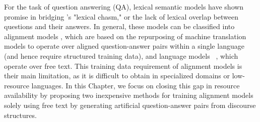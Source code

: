 



For the task of question answering (QA), lexical semantic models have shown promise in bridging \citet{Berger:00}'s "lexical chasm," or the lack of lexical overlap between questions and their answers.  In general, these models can be classified into alignment models \citep{echihabi2003noisy,Soricut:06,Riezler:etal:2007,Surdeanu:11,yao2013}, which are based on the repurposing of machine translation models to operate over aligned question-answer pairs within a single language (and hence require structured training data), and language models ~\citep{jansen14,sultan-etal:2014:TACL,yih13}, which operate over free text.  
This training data requirement of alignment models is their main limitation, as it is difficult to obtain in specialized domains or low-resource languages.
In this Chapter, we focus on closing this gap in resource availability by proposing two inexpensive methods for training alignment models solely using free text by generating artificial question-answer pairs from discourse structures. 

